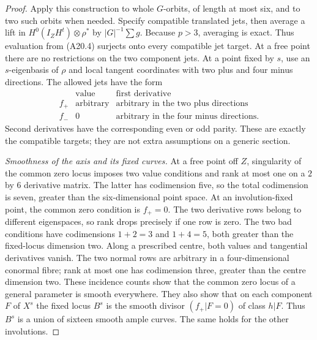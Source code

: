 \documentclass[11pt]{article}
\theoremstyle{remark}\newtheorem{remark}[theorem]{Remark}
\begin{document}
\begin{proof}
Apply this construction to whole $G$-orbits, of length
at most six, and to two such orbits when needed.
Specify compatible translated jets, then average a
lift in $H^0(I_ZH^t)\otimes\rho^*$ by $|G|^{-1}\sum g$.
Because $p>3$, averaging is exact. Thus evaluation
from (A20.4) surjects onto every compatible jet target.
At a free point there are no restrictions on the two
component jets. At a point fixed by $s$, use an
$s$-eigenbasis of $\rho$ and local tangent coordinates
with two plus and four minus directions. The allowed
jets have the form
\[
 \begin{array}{c|c|c}
       &\text{value}&\text{first derivative}\\ \hline
 f_+&\text{arbitrary}&\text{arbitrary in the two plus directions}\\
 f_-&0&\text{arbitrary in the four minus directions}.
 \end{array}                                                    \tag{A20.7}
\]
Second derivatives have the corresponding even or odd
parity. These are exactly the compatible targets;
they are not extra assumptions on a generic section.

\emph{Smoothness of the axis and its fixed curves.}
At a free point off $Z$, singularity of the common
zero locus imposes two value conditions and rank at
most one on a $2$ by $6$ derivative matrix. The latter
has codimension five, so the total codimension is seven,
greater than the six-dimensional point space.
At an involution-fixed point, the common zero condition
is $f_+=0$. The two derivative rows belong to different
eigenspaces, so rank drops precisely if one row is zero.
The two bad conditions have codimensions $1+2=3$ and
$1+4=5$, both greater than the fixed-locus dimension two.
Along a prescribed centre, both values and tangential
derivatives vanish. The two normal rows are arbitrary
in a four-dimensional conormal fibre; rank at most one
has codimension three, greater than the centre dimension
two. These incidence counts show that the common zero
locus of a general parameter is smooth everywhere.
They also show that on each component $F$ of $X^s$
the fixed locus $B^s$ is the smooth divisor $(f_+|F=0)$
of class $h|F$. Thus $B^s$ is a union of sixteen smooth
ample curves. The same holds for the other involutions.


\end{proof}
\end{document}
